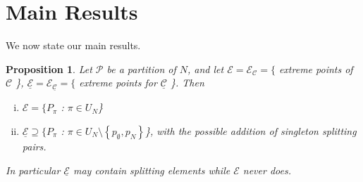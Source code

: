 \documentclass{article}
\newtheorem{prop}{Proposition}
\theoremstyle{case}
\begin{document}
\section{Main Results}
We now state our main results.
\begin{prop} \label{thm0}
Let $\mathcal{P}$ be a partition of $N$, and let $\mathcal{E} = \mathcal{E}_\mathcal{C} = \{$ extreme points of $\mathcal{C}$ \}, $\underline{\mathcal{E}} = \mathcal{E}_{\underline{\mathcal{C}}} = \{$ extreme points for $\underline{\mathcal{C}}$ \}. Then
\begin{enumerate}[(i)]
	\item $\mathcal{E} = \{P_\pi$ : $\pi \in U_N$\}
	\item $\underline{\mathcal{E}} \supseteq \{P_\pi$ : $\pi \in U_N\setminus\left\lbrace p_{\emptyset}, p_N \right\rbrace$\}, with the possible addition of singleton splitting pairs.
\end{enumerate}
In particular $\underline{\mathcal{E}}$ may contain splitting elements while $\mathcal{E}$ never does.
\end{prop}
\end{document}
